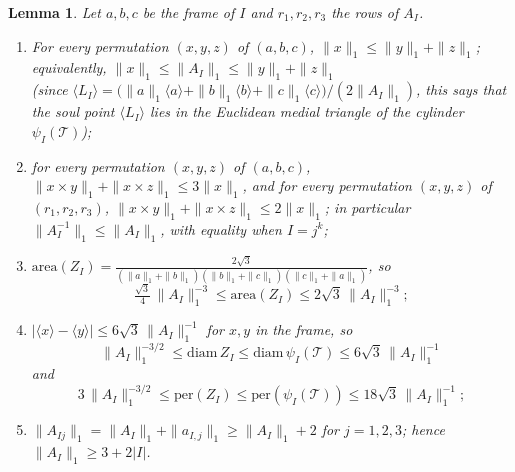 \documentclass[11pt]{amsart}
\newtheorem{lemma}[proposition]{Lemma}
\theoremstyle{definition}
\theoremstyle{remark}
\newcommand{\cT}{\mathcal T}
\newcommand{\abs}[1]{\lvert #1\rvert}
\newcommand{\norm}[1]{\lVert #1\rVert}
\newcommand{\pr}[1]{\langle #1\rangle}
\begin{document}
\begin{lemma}
    \label{lem:geom}
    Let $a,b,c$ be the frame of $I$ and $r_1,r_2,r_3$ the rows of $A_I$.
    \begin{enumerate}
    \item[(i)] For every permutation $(x,y,z)$ of $(a,b,c)$, $\|x\|_1\le \|y\|_1+\|z\|_1$; equivalently, $\|x\|_1\le\|A_I\|_1\le\|y\|_1+\|z\|_1$\\ (since $\pr{L_I}=\bigl(\|a\|_1\pr a+\|b\|_1\pr b+\|c\|_1\pr c\bigr)/(2\|A_I\|_1)$, this says that the soul point $\pr{L_I}$ lies in the Euclidean medial triangle of the cylinder $\psi_I(\cT)$);
    \item[(ii)] for every permutation $(x,y,z)$ of $(a,b,c)$, $\|x\times y\|_1+\|x\times z\|_1\le3\|x\|_1$, and for every permutation $(x,y,z)$ of $(r_1,r_2,r_3)$, $\|x\times y\|_1+\|x\times z\|_1\le2\|x\|_1$; in particular $\norm{A_I^{-1}}_1\le\|A_I\|_1$, with equality when $I=j^k$;
    \item[(iii)] $\mathrm{area}(Z_I)=\frac{2\sqrt3}{(\|a\|_1+\|b\|_1)(\|b\|_1+\|c\|_1)(\|c\|_1+\|a\|_1)}$, so
    \[
    \tfrac{\sqrt3}4\,\|A_I\|_1^{-3}\le\mathrm{area}(Z_I)\le2\sqrt3\,\|A_I\|_1^{-3};
    \]
    \item[(iv)] $\abs{\pr x-\pr y}\le6\sqrt3\,\|A_I\|_1^{-1}$ for $x,y$ in the frame, so
  \[\|A_I\|_1^{-3/2}\le\mathrm{diam}\,Z_I\le\mathrm{diam}\,\psi_I(\cT)\le6\sqrt3\,\|A_I\|_1^{-1}\]
  and
  \[3\,\|A_I\|_1^{-3/2}\le\mathrm{per}(Z_I)\le\mathrm{per}(\psi_I(\cT))\le18\sqrt3\,\|A_I\|_1^{-1};\]
  \item[(v)] $\|A_{Ij}\|_1=\|A_I\|_1+\|a_{I,j}\|_1\ge\|A_I\|_1+2$ for $j=1,2,3$; hence $\|A_I\|_1\ge3+2\abs I$.
\end{enumerate}
\end{lemma}
\end{document}
